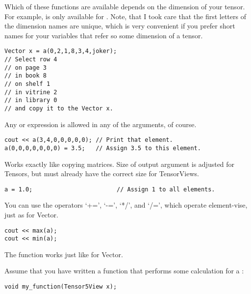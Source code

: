Which of these functions are available depends on the dimension of
your tensor. For example,  is only available for
. Note, that I took care that the first letters of the
dimension names are unique, which is very convenient if you prefer short
names for your variables that refer so some dimension of a tensor.

\begin{verbatim}
Vector x = a(0,2,1,8,3,4,joker);
// Select row 4
// on page 3 
// in book 8 
// on shelf 1 
// in vitrine 2 
// in library 0
// and copy it to the Vector x.
\end{verbatim}

Any  or  expression is allowed in any of the
arguments, of course.

\begin{verbatim}
cout << a(3,4,0,0,0,0,0); // Print that element.
a(0,0,0,0,0,0,0) = 3.5;   // Assign 3.5 to this element.
\end{verbatim}


Works exactly like copying matrices. Size of output argument is
adjusted for Tensors, but must already have the correct size for
TensorViews.

\begin{verbatim}
a = 1.0;                        // Assign 1 to all elements.
\end{verbatim}


You can use the operators `+=', `-=', `*/', and `/=', which operate
element-vise, just as for Vector.

\begin{verbatim}
cout << max(a);
cout << min(a);
\end{verbatim}


The function  works just like for Vector.


Assume that you have written a function that performs some calculation
for a :
\begin{verbatim}
void my_function(Tensor5View x);
\end{verbatim}

